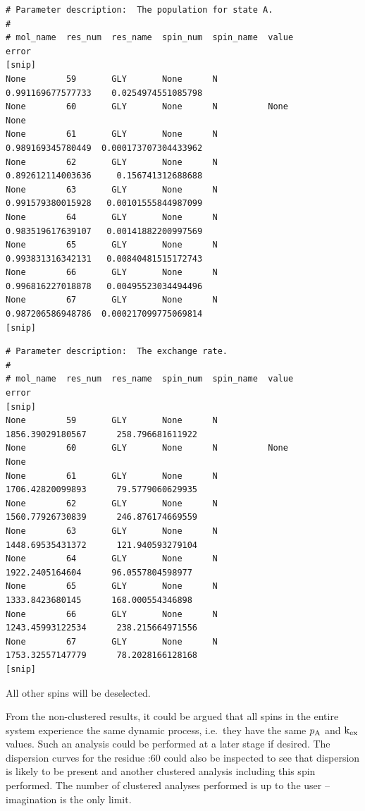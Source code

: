 \begin{lstlisting}[basicstyle=\ttfamily \scriptsize,numbers=none]
# Parameter description:  The population for state A.
#
# mol_name  res_num  res_name  spin_num  spin_name  value                 error                   
[snip]
None        59       GLY       None      N             0.991169677577733    0.0254974551085798    
None        60       GLY       None      N          None                  None                    
None        61       GLY       None      N             0.989169345780449  0.000173707304433962    
None        62       GLY       None      N             0.892612114003636     0.156741312688688    
None        63       GLY       None      N             0.991579380015928   0.00101555844987099    
None        64       GLY       None      N             0.983519617639107   0.00141882200997569    
None        65       GLY       None      N             0.993831316342131   0.00840481515172743    
None        66       GLY       None      N             0.996816227018878   0.00495523034494496    
None        67       GLY       None      N             0.987206586948786  0.000217099775069814    
[snip]
\end{lstlisting}

\begin{lstlisting}[basicstyle=\ttfamily \scriptsize,numbers=none]
# Parameter description:  The exchange rate.
#
# mol_name  res_num  res_name  spin_num  spin_name  value                 error                   
[snip]
None        59       GLY       None      N              1856.39029180567      258.796681611922    
None        60       GLY       None      N          None                  None                    
None        61       GLY       None      N              1706.42820099893      79.5779060629935    
None        62       GLY       None      N              1560.77926730839      246.876174669559    
None        63       GLY       None      N              1448.69535431372      121.940593279104    
None        64       GLY       None      N               1922.2405164604      96.0557804598977    
None        65       GLY       None      N               1333.8423680145      168.000554346898    
None        66       GLY       None      N              1243.45993122534      238.215664971556    
None        67       GLY       None      N              1753.32557147779      78.2028166128168    
[snip]
\end{lstlisting}

All other spins will be deselected.

From the non-clustered results, it could be argued that all spins in the entire system experience the same dynamic process, i.e.\ they have the same $p_{\textrm{A}}$ and $\textrm{k}_{\textrm{ex}}$ values.
Such an analysis could be performed at a later stage if desired.
The dispersion curves for the residue :60 could also be inspected to see that dispersion is likely to be present and another clustered analysis including this spin performed.
The number of clustered analyses performed is up to the user -- imagination is the only limit.

